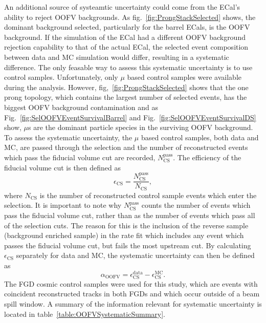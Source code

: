 \newline
\newline
An additional source of systeamtic uncertainty could come from the ECal's ability to reject OOFV backgrounds. As fig.~\ref{fig:ProngStackSelected} shows, the dominant background selected, particularly for the barrel ECals, is the OOFV background.  If the simulation of the ECal had a different OOFV background rejection capability to that of the actual ECal, the selected event composition between data and MC simulation would differ, resulting in a systematic difference.  The only feasable way to assess this systematic uncertainty is to use control samples.  Unfortunately, only $\mu$ based control samples were available during the analysis.  However, fig,~\ref{fig:ProngStackSelected} shows that the one prong topology, which contains the largest number of selected events, has the biggest OOFV background contamination and as Fig.~\ref{fig:SelOOFVEventSurvivalBarrel} and Fig.~\ref{fig:SelOOFVEventSurvivalDS} show, $\mu$s are the dominant particle species in the surviving OOFV background.  To assess the systematic uncertainty, the $\mu$ based control samples, both data and MC, are passed through the selection and the number of reconstructed events which pass the fiducial volume cut are recorded, $N_{\textrm{CS}}^{\textrm{pass}}$.  The efficiency of the fiducial volume cut is then defined as
\begin{equation}
\epsilon_{\textrm{CS}} = \frac{N_{\textrm{CS}}^{\textrm{pass}}}{N_{\textrm{CS}}},
\label{eqn:OOFVCSEfficiency}
\end{equation}
where $N_{\textrm{CS}}$ is the number of reconstructed control sample events which enter the selection.  It is important to note why $N_{\textrm{CS}}^{\textrm{pass}}$ counts the number of events which pass the fiducial volume cut, rather than as the number of events which pass all of the selection cuts.  The reason for this is the inclusion of the reverse sample (background enriched sample) in the rate fit which includes any event which passes the fiducial volume cut, but fails the most upstream cut.  By calculating $\epsilon_{\textrm{CS}}$ separately for data and MC, the systematic uncertainty can then be defined as
\begin{equation}
\alpha_{\textrm{OOFV}} = \epsilon_{\textrm{CS}}^{\textrm{data}} - \epsilon_{\textrm{CS}}^{\textrm{MC}}.
\label{eqn:OOFVSystematic}
\end{equation}
The FGD cosmic control samples were used for this study, which are events with coincident reconstructed tracks in both FGDs and which occur outside of a beam spill window.  A summary of the information relevant for systematic uncertainty is located in table~\ref{table:OOFVSystematicSummary}.  
